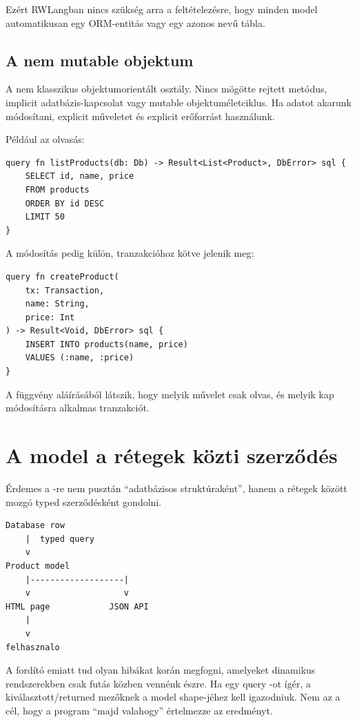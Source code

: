 Ezért RWLangban nincs szükség arra a feltételezésre, hogy minden model automatikusan egy ORM-entitás vagy egy azonos nevű tábla.

\subsection*{A  nem mutable objektum}

A  nem klasszikus objektumorientált osztály. Nincs mögötte rejtett  metódus, implicit adatbázis-kapcsolat vagy mutable objektuméletciklus. Ha adatot akarunk módosítani, explicit műveletet és explicit erőforrást használunk.

Például az olvasás:

\begin{lstlisting}[language=RWLang]
query fn listProducts(db: Db) -> Result<List<Product>, DbError> sql {
    SELECT id, name, price
    FROM products
    ORDER BY id DESC
    LIMIT 50
}
\end{lstlisting}

A módosítás pedig külön, tranzakcióhoz kötve jelenik meg:

\begin{lstlisting}[language=RWLang]
query fn createProduct(
    tx: Transaction,
    name: String,
    price: Int
) -> Result<Void, DbError> sql {
    INSERT INTO products(name, price)
    VALUES (:name, :price)
}
\end{lstlisting}

A függvény aláírásából látszik, hogy melyik művelet csak olvas, és melyik kap módosításra alkalmas tranzakciót.

\section{A model a rétegek közti szerződés}

Érdemes a -re nem pusztán ``adatbázisos struktúraként'', hanem a rétegek között mozgó typed szerződésként gondolni.

\begin{lstlisting}
Database row
    |  typed query
    v
Product model
    |-------------------|
    v                   v
HTML page            JSON API
    |
    v
felhasznalo
\end{lstlisting}

A fordító emiatt tud olyan hibákat korán megfogni, amelyeket dinamikus rendszerekben csak futás közben vennénk észre. Ha egy query -ot ígér, a kiválasztott/returned mezőknek a model shape-jéhez kell igazodniuk. Nem az a cél, hogy a program ``majd valahogy'' értelmezze az eredményt.

